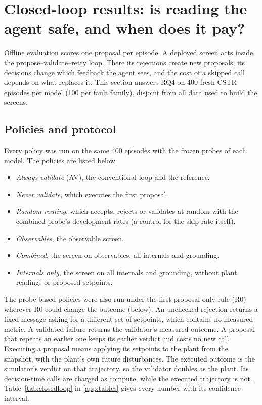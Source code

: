 \section{Closed-loop results: is reading the agent safe, and when does it pay?}\label{sec:closedloop}

Offline evaluation scores one proposal per episode. A deployed screen acts inside the propose--validate--retry
loop. There its rejections create new proposals, its decisions change which feedback the agent sees, and the
cost of a skipped call depends on what replaces it. This section answers RQ4 on 400 fresh CSTR episodes per
model (100 per fault family), disjoint from all data used to build the screens.

\subsection{Policies and protocol}
Every policy was run on the same 400 episodes with the frozen probes of each model. The policies are listed
below.
\begin{itemize}
\item \emph{Always validate} (AV), the conventional loop and the reference.
\item \emph{Never validate}, which executes the first proposal.
\item \emph{Random routing}, which accepts, rejects or validates at random with the combined probe's development
rates (a control for the skip rate itself).
\item \emph{Observables}, the observable screen.
\item \emph{Combined}, the screen on observables, all internals and grounding.
\item \emph{Internals only}, the screen on all internals and grounding, without plant readings or proposed
setpoints.
\end{itemize}
The probe-based policies were also run under the first-proposal-only rule (R0) wherever R0 could change the
outcome (below). An unchecked rejection returns a fixed message asking for a different set of setpoints, which
contains no measured metric. A validated failure returns the validator's measured outcome. A proposal that repeats
an earlier one keeps its earlier verdict and costs no new call. Executing a proposal means applying its setpoints to
the plant from the snapshot, with the plant's own future disturbances. The executed outcome is the simulator's
verdict on that trajectory, so the validator doubles as the plant. Its decision-time calls are charged as compute,
while the executed trajectory is not. Table~\ref{tab:closedloop} in \ref{app:tables} gives every number
with its confidence interval.

